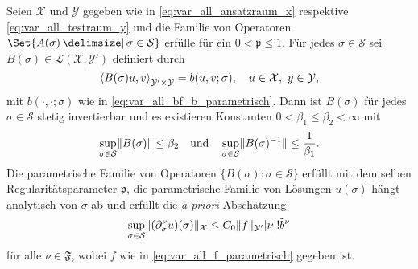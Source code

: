 \begin{Satz}
    \label{thm:kunoth:theorem21}
    Seien $\mathcal X$ und $\mathcal Y$ gegeben wie in \eqref{eq:var_all_ansatzraum_x} respektive \eqref{eq:var_all_testraum_y} und die Familie von Operatoren $\Set{ A(\sigma) \given \sigma \in \mathcal S }$ erfülle  für ein $0 < \mathfrak p \leq 1$.
    Für jedes $\sigma \in \mathcal S$ sei $B(\sigma) \in \mathcal L(\mathcal X, \mathcal Y')$ definiert durch
    \begin{equation}
        \label{eq:var_all_gross_b_parametrisch}
        \left\langle B(\sigma) u,v\right\rangle_{\mathcal Y' \times \mathcal Y} = b(u, v; \sigma), \quad u \in \mathcal X,~y \in \mathcal Y,
    \end{equation}
    mit $b(\cdot, \cdot; \sigma)$ wie in \eqref{eq:var_all_bf_b_parametrisch}.
    Dann ist $B(\sigma)$ für jedes $\sigma \in \mathcal S$ stetig invertierbar und es existieren Konstanten $0 < \beta_{1} \leq \beta_{2} < \infty$ mit
    \begin{equation}
        \label{eq:var_all_norm_B_und_B_inv_parametrisch}
        \sup_{\sigma \in \mathcal S} \lVert B(\sigma)\rVert \leq \beta_{2} \quad \text{und} \quad  \sup_{\sigma \in \mathcal S} \lVert B(\sigma)^{-1}\rVert \leq \frac{1}{\beta_{1}}.
    \end{equation}
    Die parametrische Familie von Operatoren $\{ B(\sigma) : \sigma \in \mathcal S \}$ erfüllt  mit dem selben Regularitätsparameter $\mathfrak p$, die parametrische Familie von Lösungen $u(\sigma)$ hängt analytisch von $\sigma$ ab und erfüllt die \emph{a priori}-Abschätzung
    \begin{equation}
        \label{eq:var_all_a_priori_schranke}
        \sup_{\sigma \in \mathcal S} \lVert(\partial^{\nu}_{\sigma} u)(\sigma)\rVert_{\mathcal X} \leq C_{0} \lVert f\rVert_{\mathcal Y'} \lvert\nu\rvert! \tilde{b}^{\nu}
    \end{equation}
    für alle $\nu \in \mathfrak F$, wobei $f$ wie in \eqref{eq:var_all_f_parametrisch} gegeben ist.
\end{Satz}




